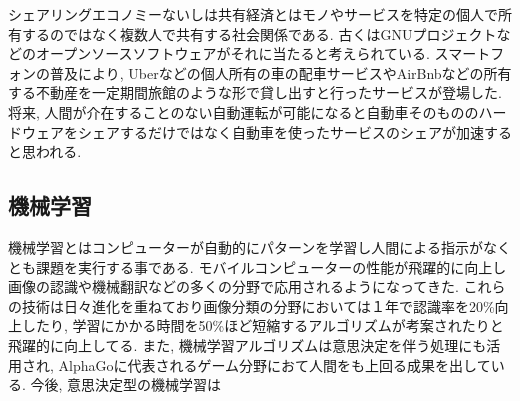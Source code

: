 シェアリングエコノミー\cite{Sharing}ないしは共有経済とはモノやサービスを特定の個人で所有するのではなく複数人で共有する社会関係である.
古くはGNUプロジェクトなどのオープンソースソフトウェアがそれに当たると考えられている.
スマートフォンの普及により, Uberなどの個人所有の車の配車サービスやAirBnbなどの所有する不動産を一定期間旅館のような形で貸し出すと行ったサービスが登場した.
将来, 人間が介在することのない自動運転が可能になると自動車そのもののハードウェアをシェアするだけではなく自動車を使ったサービスのシェアが加速すると思われる.


\subsection{機械学習}

機械学習とはコンピューターが自動的にパターンを学習し人間による指示がなくとも課題を実行する事である.
モバイルコンピューターの性能が飛躍的に向上し画像の認識や機械翻訳などの多くの分野で応用されるようになってきた.
これらの技術は日々進化を重ねており画像分類の分野においては１年で認識率を20\%向上したり, 学習にかかる時間を50\%ほど短縮するアルゴリズムが考案されたりと飛躍的に向上してる.
また, 機械学習アルゴリズムは意思決定を伴う処理にも活用され, AlphaGoに代表されるゲーム分野におて人間をも上回る成果を出している.
今後, 意思決定型の機械学習は

